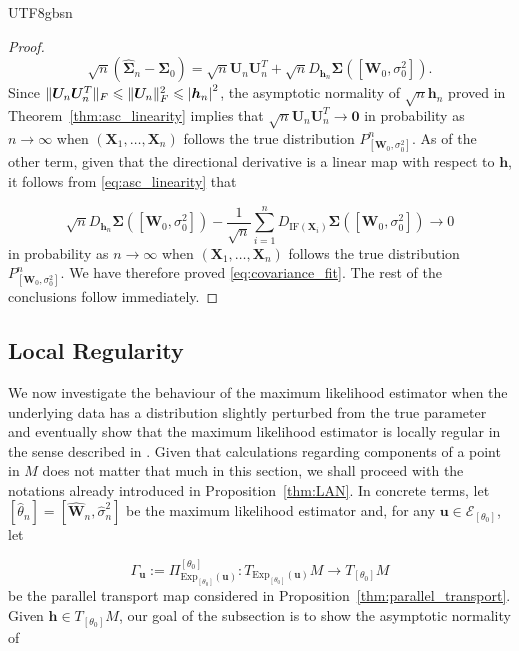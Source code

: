 \documentclass[12pt]{report}
\newcommand{\bracket}[1]{\left ( #1 \right )}
\newcommand{\squared}[1]{\left [ #1 \right ]}
\theoremstyle{plain}
\theoremstyle{definition}
\begin{document}
\begin{CJK*}{UTF8}{gbsn}
\begin{proof}
\begin{equation*}
  \sqrt{n}\bracket{\hat{\bm{\Sigma}}_n - \bm{\Sigma}_0}
  = \sqrt{n}\bm{U}_n\bm{U}_n^T + \sqrt{n} D_{\bm{h}_n} \bm{\Sigma}([\bm{W}_0, \sigma_0^2]).
\end{equation*}
Since $\|\bm{U}_n\bm{U}_n^T\|_F \leqslant	\|\bm{U}_n\|_F^2 \leqslant \abs{\bm{h}_n}^2$,
the asymptotic normality of $\sqrt{n}\bm{h}_n$ proved in 
Theorem~\ref{thm:asc_linearity} implies 
that $\sqrt{n}\bm{U}_n\bm{U}_n^T \to \bm{0}$ 
in probability as $n \to \infty$ when $(\bm{X}_1, \ldots, \bm{X}_n)$
follows the true distribution $P^n_{[\bm{W}_0, \sigma_0^2]}$.
As of the other term,
given that the directional derivative is a linear map with respect to 
$\bm{h}$, it follows from \eqref{eq:asc_linearity} that 

\begin{equation*}
  \sqrt{n} D_{\bm{h}_n} \bm{\Sigma}([\bm{W}_0, \sigma_0^2])
  - \frac{1}{\sqrt{n}} \sum_{i=1}^n D_{\text{IF}(\bm{X}_i)}\bm{\Sigma}(\squared{\bm{W}_0, \sigma_0^2}) \to 0
\end{equation*}
in probability as $n \to \infty$ when $(\bm{X}_1, \ldots, \bm{X}_n)$
follows the true distribution $P^n_{[\bm{W}_0, \sigma_0^2]}$.
We have therefore proved \eqref{eq:covariance_fit}.
The rest of the conclusions follow immediately.
\end{proof}

\subsection{Local Regularity}

We now investigate the behaviour of the maximum likelihood 
estimator when the underlying data has a distribution 
slightly perturbed from the true parameter
and eventually show that the maximum likelihood estimator is locally regular
in the sense described in \cite{Sun_Lin_Liu_2026}.
Given that calculations regarding components of a point in $M$ 
does not matter that much in this section,
we shall proceed with the notations already introduced in Proposition~\ref{thm:LAN}.
In concrete terms, 
let $\squared{\hat{\theta}_n}=[\hat{\bm{W}}_n, \hat{\sigma}_n^2]$ be the maximum likelihood estimator 
and, for any $\bm{u} \in \mathcal{E}_{[\theta_0]}$, let

\begin{equation*}
  \Gamma_{\bm{u}} := \Pi^{[\theta_0]}_{\text{Exp}_{[\theta_0]}(\bm{u})} :
  T_{\text{Exp}_{[\theta_0]}(\bm{u})}M  \to T_{[\theta_0]}M
\end{equation*}
be the parallel transport map considered in 
Proposition~\ref{thm:parallel_transport}.
Given $\bm{h} \in T_{[\theta_0]}M$,
our goal of the subsection is to show 
the asymptotic normality of


\end{CJK*}
\end{document}
